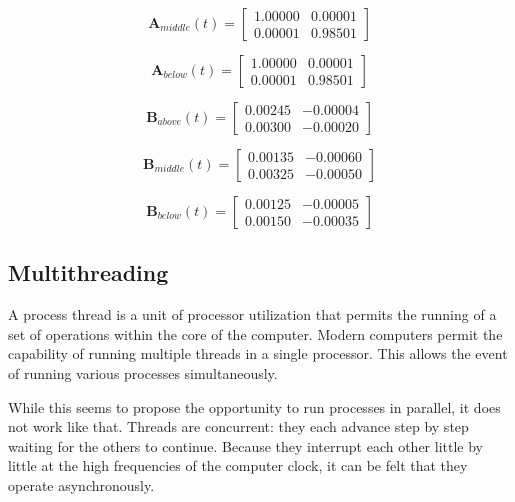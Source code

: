 \documentclass[12pt]{article}
\begin{document}
\begin{equation}
\label{eqn:6}
\mathbf{A}_{middle}(t) = 
\begin{bmatrix}
1.00000 & 0.00001 \\
0.00001 & 0.98501
\end{bmatrix}
\end{equation}

\begin{equation}
\label{eqn:7}
\mathbf{A}_{below}(t) = 
\begin{bmatrix}
1.00000 & 0.00001 \\
0.00001 & 0.98501
\end{bmatrix}
\end{equation}

\begin{equation}
\label{eqn:8}
\mathbf{B}_{above}(t) = 
\begin{bmatrix}
0.00245 & -0.00004 \\
0.00300 & -0.00020
\end{bmatrix}
\end{equation}

\begin{equation}
\label{eqn:9}
\mathbf{B}_{middle}(t) = 
\begin{bmatrix}
0.00135 & -0.00060 \\
0.00325 & -0.00050
\end{bmatrix}
\end{equation}

\begin{equation}
\label{eqn:10}
\mathbf{B}_{below}(t) = 
\begin{bmatrix}
0.00125 & -0.00005 \\
0.00150 & -0.00035
\end{bmatrix}
\end{equation}

\subsection{Multithreading}

A process thread is a unit of processor utilization that permits the running of a set of operations within the core of the computer. Modern computers permit the capability of running multiple threads in a single processor. This allows the event of running various processes simultaneously.

While this seems to propose the opportunity to run processes in parallel, it does not work like that. Threads are concurrent: they each advance step by step waiting for the others to continue. Because they interrupt each other little by little at the high frequencies of the computer clock, it can be felt that they operate asynchronously.
\end{document}
